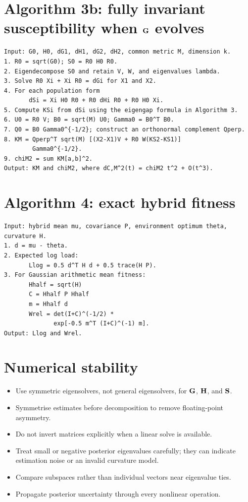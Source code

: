 \section{Algorithm 3b: fully invariant susceptibility when \(\mathbf{G}\) evolves}

\begin{lstlisting}
Input: G0, H0, dG1, dH1, dG2, dH2, common metric M, dimension k.
1. R0 = sqrt(G0); S0 = R0 H0 R0.
2. Eigendecompose S0 and retain V, W, and eigenvalues lambda.
3. Solve R0 Xi + Xi R0 = dGi for X1 and X2.
4. For each population form
       dSi = Xi H0 R0 + R0 dHi R0 + R0 H0 Xi.
5. Compute KSi from dSi using the eigengap formula in Algorithm 3.
6. U0 = R0 V; B0 = sqrt(M) U0; Gamma0 = B0^T B0.
7. Q0 = B0 Gamma0^{-1/2}; construct an orthonormal complement Qperp.
8. KM = Qperp^T sqrt(M) [(X2-X1)V + R0 W(KS2-KS1)]
        Gamma0^{-1/2}.
9. chiM2 = sum KM[a,b]^2.
Output: KM and chiM2, where dC,M^2(t) = chiM2 t^2 + O(t^3).
\end{lstlisting}

\section{Algorithm 4: exact hybrid fitness}

\begin{lstlisting}
Input: hybrid mean mu, covariance P, environment optimum theta, curvature H.
1. d = mu - theta.
2. Expected log load:
       Llog = 0.5 d^T H d + 0.5 trace(H P).
3. For Gaussian arithmetic mean fitness:
       Hhalf = sqrt(H)
       C = Hhalf P Hhalf
       m = Hhalf d
       Wrel = det(I+C)^(-1/2) *
              exp[-0.5 m^T (I+C)^(-1) m].
Output: Llog and Wrel.
\end{lstlisting}

\section{Numerical stability}

\begin{itemize}[leftmargin=1.6em]
\item Use symmetric eigensolvers, not general eigensolvers, for \(\mathbf{G}\), \(\mathbf{H}\), and \(\mathbf{S}\).
\item Symmetrise estimates before decomposition to remove floating-point asymmetry.
\item Do not invert matrices explicitly when a linear solve is available.
\item Treat small or negative posterior eigenvalues carefully; they can indicate estimation noise or an invalid curvature model.
\item Compare subspaces rather than individual vectors near eigenvalue ties.
\item Propagate posterior uncertainty through every nonlinear operation.
\end{itemize}

